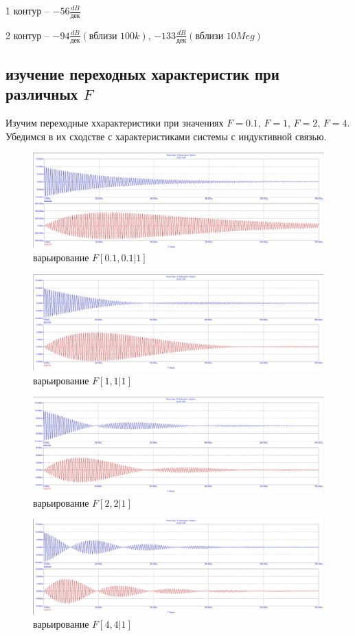 \documentclass[a4paper, 14pt]{extarticle}%
\begin{document}
1 контур -- $-56\frac{dB}{\text{дек}}$

2 контур -- $-94\frac{dB}{\text{дек}}(\text{вблизи $100k$})$, $-133\frac{dB}{\text{дек}}(\text{вблизи $10Meg$})$



\subsection{изучение переходных характеристик при различных $F$}

Изучим  переходные ххарактеристики при значениях $F = 0.1$,  $F = 1$,  $F = 2$,   $F = 4$. Убедимся в их сходстве с характеристиками системы с индуктивной связью. 

\begin{figure}[h!]
	\centering
			\includegraphics[width=1.1\linewidth]{2.3_varF1.jpg}
            \caption{варьирование $F  [0.1, 0.1|1]$}
	\label{A}
\end{figure}


\begin{figure}[h!]
	\centering
			\includegraphics[width=1.1\linewidth]{2.3_varF2.jpg}
            \caption{варьирование $F  [1, 1|1]$}
	\label{A}
\end{figure}

\begin{figure}[h!]
	\centering
			\includegraphics[width=1.1\linewidth]{2.3_varF3.jpg}
            \caption{варьирование $F   [2, 2|1]$}
	\label{A}
\end{figure}


\begin{figure}[h!]
	\centering
			\includegraphics[width=1.1\linewidth]{2.3_varF4.jpg}
            \caption{варьирование $F  [4, 4|1]$}
	\label{A}
\end{figure}
\end{document}
